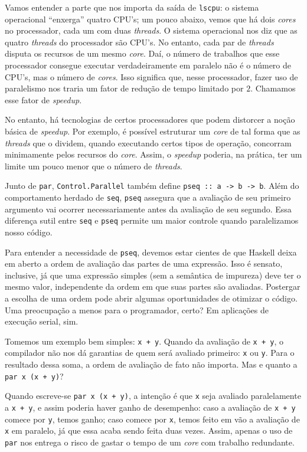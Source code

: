 \documentclass[a4paper]{article}
\begin{document}
Vamos entender a parte que nos importa da saída de \texttt{lscpu}:
o sistema operacional ``enxerga'' quatro CPU's;
um pouco abaixo, vemos que há dois \emph{cores} no processador, cada um com duas \emph{threads}.
O sistema operacional nos diz que as quatro \emph{threads} do processador são CPU's.
No entanto, cada par de \emph{threads} disputa os recursos de um mesmo \emph{core}.
Daí, o número de trabalhos que esse processador consegue executar verdadeiramente em paralelo não é o número de CPU's, mas o número de \emph{cores}.
Isso significa que, nesse processador, fazer uso de paralelismo nos traria um fator de redução de tempo limitado por $2$.
Chamamos esse fator de \emph{speedup}.

No entanto, há tecnologias de certos processadores que podem distorcer a noção básica de \emph{speedup}.
Por exemplo, é possível estruturar um \emph{core} de tal forma que as \emph{threads} que o dividem, quando executando certos tipos de operação, concorram minimamente pelos recursos do \emph{core}.
Assim, o \emph{speedup} poderia, na prática, ter um limite um pouco menor que o número de \emph{threads}.

Junto de \texttt{par}, \texttt{Control.Parallel} também define \texttt{pseq :: a -> b -> b}.
Além do comportamento herdado de \texttt{seq}, \texttt{pseq} assegura que a avaliação de seu primeiro argumento vai ocorrer necessariamente antes da avaliação de seu segundo.
Essa diferença sutil entre \texttt{seq} e \texttt{pseq} permite um maior controle quando paralelizamos nosso código.

Para entender a necessidade de \texttt{pseq}, devemos estar cientes de que Haskell deixa em aberto a ordem de avaliação das partes de uma expressão.
Isso é sensato, inclusive, já que uma expressão simples (sem a semântica de impureza) deve ter o mesmo valor, independente da ordem em que suas partes são avaliadas.
Postergar a escolha de uma ordem pode abrir algumas oportunidades de otimizar o código.
Uma preocupação a menos para o programador, certo? Em aplicações de execução serial, sim.

Tomemos um exemplo bem simples: \texttt{x + y}.
Quando da avaliação de \texttt{x + y}, o compilador não nos dá garantias de quem será avaliado primeiro: \texttt{x} ou \texttt{y}.
Para o resultado dessa soma, a ordem de avaliação de fato não importa.
Mas e quanto a \texttt{par x (x + y)}?

Quando escreve-se \texttt{par x (x + y)}, a intenção é que \texttt{x} seja avaliado paralelamente a \mbox{\texttt{x + y}}, e assim poderia haver ganho de desempenho:
caso a avaliação de \texttt{x + y} comece por \texttt{y}, temos ganho;
caso comece por \texttt{x}, temos feito em vão a avaliação de \texttt{x} em paralelo, já que essa acaba sendo feita duas vezes.
Assim, apenas o uso de \texttt{par} nos entrega o risco de gastar o tempo de um \emph{core} com trabalho redundante.
\end{document}
